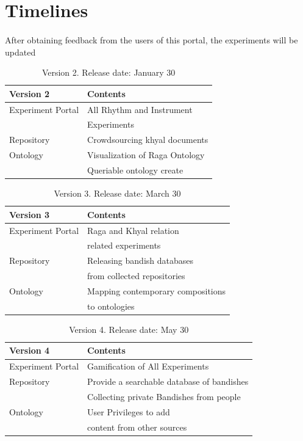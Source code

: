 \documentclass{tufte-handout}
\begin{document}
\section{Timelines}


\paragraph*{}
After obtaining feedback from the users of this portal, the experiments will be updated

\begin{table}[h]
\begin{tabular}{ll}
\toprule
Version 2                    & Contents      \\
\midrule
Experiment Portal & All Rhythm and Instrument\\ & Experiments\\
Repository & Crowdsourcing khyal documents\\
Ontology & Visualization of Raga Ontology\\
& Queriable ontology create\\
\bottomrule    
\end{tabular}
\caption{Version 2. Release date: January 30}
\end{table}


\begin{table}[h]
\begin{tabular}{ll}
\toprule
Version 3                    & Contents      \\
\midrule
Experiment Portal              & Raga and Khyal relation\\
& related experiments\\
Repository                     & Releasing bandish databases\\
& from collected repositories\\
Ontology & Mapping contemporary compositions\\
 & to ontologies\\
\bottomrule    
\end{tabular}
\caption{Version 3. Release date: March 30}
\end{table}


\begin{table}[h]
\begin{tabular}{ll}
\toprule
Version 4                    & Contents      \\
\midrule
Experiment Portal              & Gamification of All Experiments\\
Repository                     & Provide a searchable database of bandishes\\
 & Collecting private Bandishes from people\\
Ontology & User Privileges to add \\ 
& content from other sources\\
\bottomrule    
\end{tabular}
\caption{Version 4. Release date: May 30}
\end{table}
\end{document}
